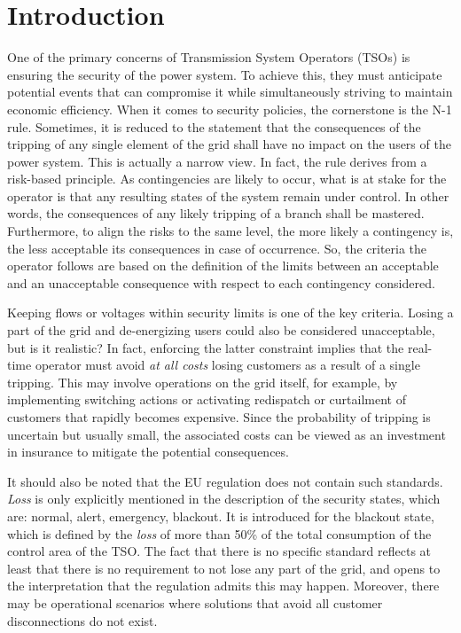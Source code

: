 \section{Introduction}

One of the primary concerns of Transmission System Operators (TSOs) is ensuring the security of the power system. To achieve this, they must anticipate potential events that can compromise it while simultaneously striving to maintain economic efficiency.
When it comes to security policies, the cornerstone is the N-1 rule. Sometimes, it is
reduced to the statement that the consequences of the tripping of any single element
of the grid shall have no impact on the users of the power system. This is
actually a narrow view. In fact, the rule derives from a risk-based principle. As
contingencies are likely to occur, what is at stake for the operator is that any resulting
states of the system remain under control. In other words, the consequences of
any likely tripping of a branch shall be mastered. Furthermore, to align the risks to the
same level, the more likely a contingency is, the less acceptable its
consequences in case of occurrence. So, the criteria the operator follows
are based on the definition of the limits between an acceptable and an unacceptable
consequence with respect to each contingency considered.

Keeping flows or voltages within security limits is one of the key
criteria. Losing a part of the grid and de-energizing users could also be
considered unacceptable, but is it realistic? In fact, enforcing the latter constraint
implies that the real-time operator must avoid \emph{at all costs} losing customers
as a result of a single tripping. This may involve operations on the grid itself,
for example, by implementing switching actions or activating redispatch or curtailment of customers that rapidly becomes expensive. Since the probability of tripping
is uncertain but usually small, the associated costs can be viewed as an investment in insurance
to mitigate the potential consequences.

It should also be noted that the EU regulation \cite{eu-2017/1485} does not contain such
standards. \emph{Loss} is only explicitly mentioned in the description of the security
states, which are: normal, alert, emergency, blackout. It is introduced
for the blackout state, which is defined by the \emph{loss} of more than 50\% of
the total consumption of the control area of the TSO. The fact that there is no specific
standard reflects at least that there is no requirement to not lose any part of the grid,
and opens to the interpretation that the regulation admits this may happen. Moreover, there may be operational scenarios where solutions that avoid all customer disconnections do not exist. 


